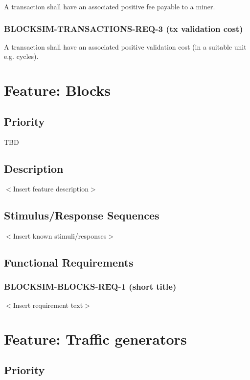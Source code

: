 \documentclass{scrreprt}
\begin{document}
A transaction shall have an associated positive fee payable to a miner.

\subsubsection{BLOCKSIM-TRANSACTIONS-REQ-3 (tx validation cost)}

A transaction shall have an associated positive validation cost (in a suitable unit e.g. cycles).



\section{Feature: Blocks}

\subsection{Priority}

TBD

\subsection{Description}

$<$Insert feature description$>$


\subsection{Stimulus/Response Sequences}

$<$Insert known stimuli/responses$>$


\subsection{Functional Requirements}

\subsubsection{BLOCKSIM-BLOCKS-REQ-1 (short title)}

$<$Insert requirement text$>$





\section{Feature: Traffic generators}

\subsection{Priority}
\end{document}
